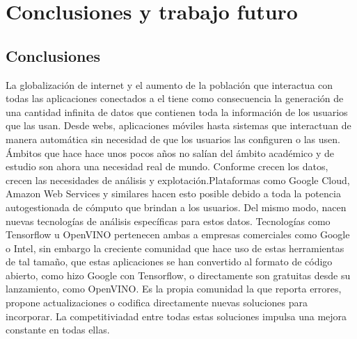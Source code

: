 \cleardoublepage
\mbox{}

\chapter{Conclusiones y trabajo futuro}
\label{ch:chapte6}

\section{Conclusiones}\label{sec:conclusiones}
La globalización de internet y el aumento de la población que interactua con todas las aplicaciones conectados a el tiene como consecuencia
la generación de una cantidad infinita de datos que contienen toda la información de los usuarios que las usan.
Desde webs, aplicaciones móviles hasta sistemas que interactuan de manera automática sin necesidad de que los usuarios las configuren o las usen.
Ámbitos que hace hace unos pocos años no salían del ámbito académico y de estudio son ahora una necesidad real de mundo.
Conforme crecen los datos, crecen las necesidades de análisis y explotación.Plataformas como Google Cloud, Amazon Web Services y similares hacen esto posible
debido a toda la potencia autogestionada de cómputo que brindan a los usuarios.
Del mismo modo, nacen nuevas tecnologías de análisis específicas para estos datos.
Tecnologías como Tensorflow u OpenVINO pertenecen ambas a empresas comerciales como Google o Intel, sin embargo la creciente comunidad que hace uso de estas
herramientas de tal tamaño, que estas aplicaciones se han convertido al formato de código abierto, como hizo Google con Tensorflow, o directamente son gratuitas desde su lanzamiento, como OpenVINO.
Es la propia comunidad la que reporta errores, propone actualizaciones o codifica directamente nuevas soluciones para incorporar.
La competitiviadad entre todas estas soluciones impulsa una mejora constante en todas ellas.



